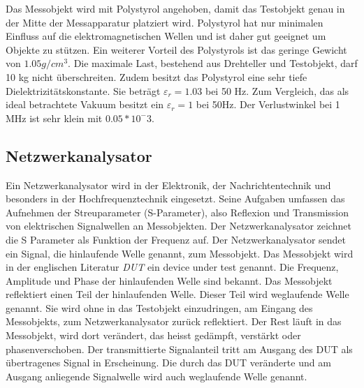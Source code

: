 Das Messobjekt wird mit Polystyrol angehoben, damit das Testobjekt genau in der Mitte der Messapparatur platziert wird. Polystyrol hat nur minimalen Einfluss auf die elektromagnetischen Wellen und ist daher gut geeignet um Objekte zu stützen. Ein weiterer Vorteil des Polystyrols ist das geringe Gewicht von $1.05 g/cm^3$. Die maximale Last, bestehend aus Drehteller und Testobjekt, darf  10 kg  nicht überschreiten. Zudem besitzt das Polystyrol eine sehr tiefe Dielektrizitätskonstante. Sie beträgt $\varepsilon_r=1.03$ bei 50 Hz. Zum Vergleich, das als ideal betrachtete Vakuum  besitzt ein $\varepsilon_r=1$ bei 50Hz. Der Verlustwinkel bei 1 MHz ist sehr klein mit $0.05*10^-3$.
\cite{StarLab,Polystyrol_Datenblatt,WikiPermitt} 


\subsection{Netzwerkanalysator}
Ein Netzwerkanalysator wird in der Elektronik, der Nachrichtentechnik und besonders in der Hochfrequenztechnik eingesetzt. Seine Aufgaben umfassen das Aufnehmen der Streuparameter (S-Parameter), also Reflexion und Transmission von elektrischen Signalwellen an
Messobjekten. Der Netzwerkanalysator zeichnet die S Parameter als Funktion der Frequenz auf. Der Netzwerkanalysator sendet ein Signal, die  hinlaufende Welle genannt, zum  Messobjekt. Das Messobjekt wird in der englischen Literatur  \textit{DUT} ein device under test genannt. Die  Frequenz, Amplitude und Phase der hinlaufenden Welle sind bekannt. Das Messobjekt reflektiert einen Teil der hinlaufenden Welle. Dieser Teil wird weglaufende Welle genannt. Sie wird ohne in das Testobjekt einzudringen, am Eingang des Messobjekts, zum Netzwerkanalysator zurück reflektiert. Der Rest läuft in das Messobjekt, wird dort verändert, das heisst gedämpft, verstärkt oder phasenverschoben. Der transmittierte Signalanteil tritt am Ausgang des DUT als übertragenes Signal in Erscheinung. Die durch das DUT veränderte und am Ausgang anliegende Signalwelle wird auch  weglaufende Welle genannt.

